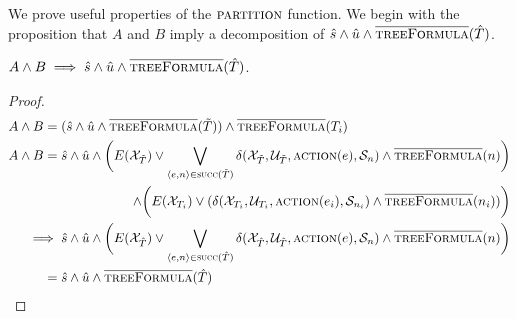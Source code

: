 We prove useful properties of the $\textsc{partition}$ function. We begin with the proposition that $A$ and $B$ imply a decomposition of $\hat{s} \land \hat{u} \land \textsc{$\overline{\mbox{treeFormula}}$}(\hat{T})$. 
\begin{proposition}\label{prop:aandb}
    $A\land B \implies \hat{s} \land \hat{u} \land \textsc{$\overline{\mbox{treeFormula}}$}(\hat{T})$.
\end{proposition}
\begin{proof}
    \begin{align*}
        A \land B ={}& (\hat{s} \land \hat{u} \land \opptf(\tilde{T})) \land \opptf(T_i) \\
        A \land B ={}& \hat{s} \land \hat{u} \land \bigg( E(\mathcal{X}_{\tilde{T}}) \lor \bigvee_{\langle e, n \rangle \in \textsc{succ}(\tilde{T})} \delta(\mathcal{X}_{\tilde{T}}, \mathcal{U}_{\tilde{T}}, \textsc{action}(e), \mathcal{S}_n) \land \opptf(n) \bigg) \\
                     & \pushright{\land \bigg( E(\mathcal{X}_{T_i}) \lor (\delta(\mathcal{X}_{T_i}, \mathcal{U}_{T_i}, \textsc{action}(e_i), \mathcal{S}_{n_i}) \land \opptf(n_i)) \bigg)} \\
        \implies{}& \hat{s} \land \hat{u} \land \bigg( E(\mathcal{X}_{\hat{T}}) \lor \bigvee_{\langle e, n \rangle \in \textsc{succ}(\hat{T})} \delta(\mathcal{X}_{\hat{T}}, \mathcal{U}_{\hat{T}}, \textsc{action}(e), \mathcal{S}_n) \land \opptf(n) \bigg) \\
        ={}& \hat{s} \land \hat{u} \land \opptf(\hat{T})
    \end{align*}
\end{proof}

